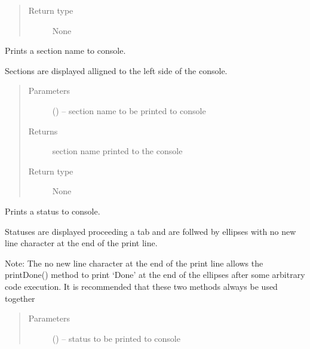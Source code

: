 \documentclass[letterpaper,10pt,english]{sphinxmanual}
\begin{document}
\begin{fulllineitems}
\begin{fulllineitems}
\begin{quote}
\begin{description}
\item[{Return type}] \leavevmode
None

\end{description}\end{quote}

\end{fulllineitems}


\begin{fulllineitems}
\label{\detokenize{MouseReferenceManual:Modules.Base.ModuleBaseClass.printSection}}
Prints a section name to console.

Sections are displayed alligned to the left side of the console.
\begin{quote}\begin{description}
\item[{Parameters}] \leavevmode
{} () -- section name to be printed to console

\item[{Returns}] \leavevmode
section name printed to the console

\item[{Return type}] \leavevmode
None

\end{description}\end{quote}

\end{fulllineitems}


\begin{fulllineitems}
\label{\detokenize{MouseReferenceManual:Modules.Base.ModuleBaseClass.printStatus}}
Prints a status to console.

Statuses are displayed proceeding a tab and are follwed by ellipses with no new line character at the end of the print line.

Note:
The no new line character at the end of the print line allows the printDone() method to print `Done' at the end of the ellipses after some arbitrary code execution. It is recommended that these two methods always be used together
\begin{quote}\begin{description}
\item[{Parameters}] \leavevmode
{} () -- status to be printed to console


\end{description}
\end{quote}
\end{fulllineitems}
\end{fulllineitems}
\end{document}
